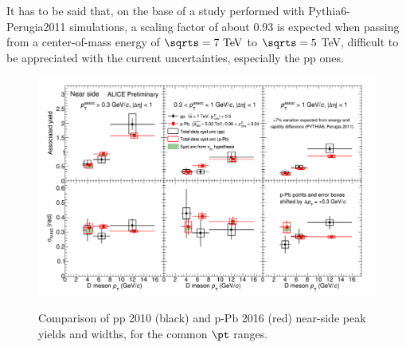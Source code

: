 It has to be said that, on the base of a study performed with Pythia6-Perugia2011 simulations, a scaling factor of about 0.93 is expected when passing from a center-of-mass energy of $\rm{\sqrts = 7 ~ TeV}$ to $\rm{\sqrts = 5}$ TeV, difficult to be appreciated with the current uncertainties, especially the pp ones.

\begin{figure}[!htbp]
\centering
{\includegraphics[width=\linewidth]{figures/CfrPPandModels/ComparePPtoPPbFitResults.png}}
\caption{Comparison of pp 2010 (black) and p-Pb 2016 (red) near-side peak yields and widths, for the common $\pt$ ranges.}
\label{fig:CfrppObs}
\end{figure}
